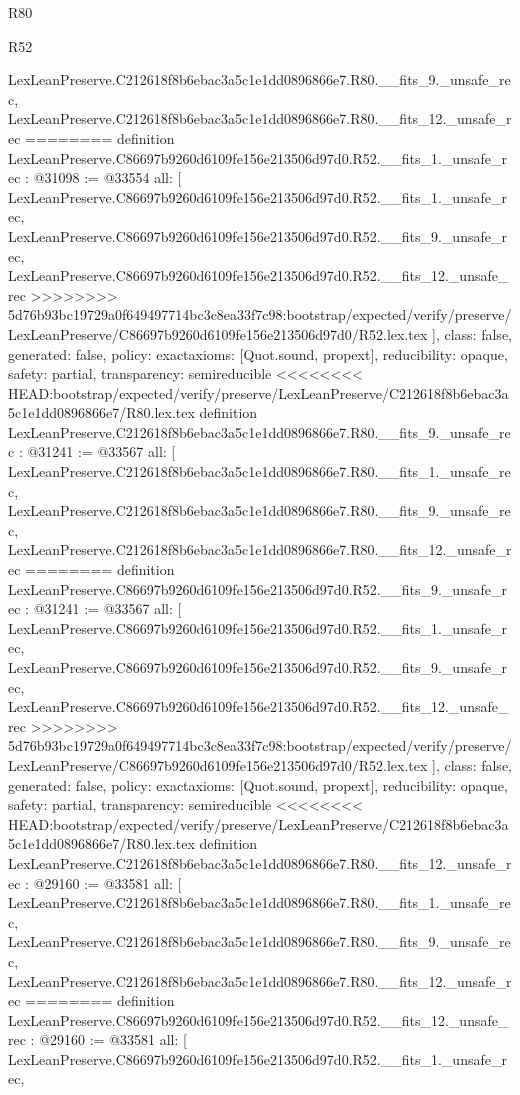 \begin{lexlean}{R80}
\begin{lexlean}{R52}
\begin{coremodule}
{{{{{{{{{{{{{{{{{{{{{{{{{{{{{{{{{{{{{{{{{{{{{{{{{{{{{{{{{{{{{{{{{{{{{{{{{{{{{{{{{{{{{{{{{{{{{{{{{{{{{{{{{{{{{{{{{{{{{{{{{{{{{{{{{{{{{{{{{{{{{{{{{{{{{{{{{{{    LexLeanPreserve.C212618f8b6ebac3a5c1e1dd0896866e7.R80.__fits_9._unsafe_rec,
    LexLeanPreserve.C212618f8b6ebac3a5c1e1dd0896866e7.R80.__fits_12._unsafe_rec
========
definition LexLeanPreserve.C86697b9260d6109fe156e213506d97d0.R52.__fits_1._unsafe_rec : @31098 := @33554 {
  all: [
    LexLeanPreserve.C86697b9260d6109fe156e213506d97d0.R52.__fits_1._unsafe_rec,
    LexLeanPreserve.C86697b9260d6109fe156e213506d97d0.R52.__fits_9._unsafe_rec,
    LexLeanPreserve.C86697b9260d6109fe156e213506d97d0.R52.__fits_12._unsafe_rec
>>>>>>>> 5d76b93bc19729a0f649497714bc3c8ea33f7c98:bootstrap/expected/verify/preserve/LexLeanPreserve/C86697b9260d6109fe156e213506d97d0/R52.lex.tex
  ],
  class: false,
  generated: false,
  policy: exact{axioms: [Quot.sound, propext]},
  reducibility: opaque{},
  safety: partial,
  transparency: semireducible
}
<<<<<<<< HEAD:bootstrap/expected/verify/preserve/LexLeanPreserve/C212618f8b6ebac3a5c1e1dd0896866e7/R80.lex.tex
definition LexLeanPreserve.C212618f8b6ebac3a5c1e1dd0896866e7.R80.__fits_9._unsafe_rec : @31241 := @33567 {
  all: [
    LexLeanPreserve.C212618f8b6ebac3a5c1e1dd0896866e7.R80.__fits_1._unsafe_rec,
    LexLeanPreserve.C212618f8b6ebac3a5c1e1dd0896866e7.R80.__fits_9._unsafe_rec,
    LexLeanPreserve.C212618f8b6ebac3a5c1e1dd0896866e7.R80.__fits_12._unsafe_rec
========
definition LexLeanPreserve.C86697b9260d6109fe156e213506d97d0.R52.__fits_9._unsafe_rec : @31241 := @33567 {
  all: [
    LexLeanPreserve.C86697b9260d6109fe156e213506d97d0.R52.__fits_1._unsafe_rec,
    LexLeanPreserve.C86697b9260d6109fe156e213506d97d0.R52.__fits_9._unsafe_rec,
    LexLeanPreserve.C86697b9260d6109fe156e213506d97d0.R52.__fits_12._unsafe_rec
>>>>>>>> 5d76b93bc19729a0f649497714bc3c8ea33f7c98:bootstrap/expected/verify/preserve/LexLeanPreserve/C86697b9260d6109fe156e213506d97d0/R52.lex.tex
  ],
  class: false,
  generated: false,
  policy: exact{axioms: [Quot.sound, propext]},
  reducibility: opaque{},
  safety: partial,
  transparency: semireducible
}
<<<<<<<< HEAD:bootstrap/expected/verify/preserve/LexLeanPreserve/C212618f8b6ebac3a5c1e1dd0896866e7/R80.lex.tex
definition LexLeanPreserve.C212618f8b6ebac3a5c1e1dd0896866e7.R80.__fits_12._unsafe_rec : @29160 := @33581 {
  all: [
    LexLeanPreserve.C212618f8b6ebac3a5c1e1dd0896866e7.R80.__fits_1._unsafe_rec,
    LexLeanPreserve.C212618f8b6ebac3a5c1e1dd0896866e7.R80.__fits_9._unsafe_rec,
    LexLeanPreserve.C212618f8b6ebac3a5c1e1dd0896866e7.R80.__fits_12._unsafe_rec
========
definition LexLeanPreserve.C86697b9260d6109fe156e213506d97d0.R52.__fits_12._unsafe_rec : @29160 := @33581 {
  all: [
    LexLeanPreserve.C86697b9260d6109fe156e213506d97d0.R52.__fits_1._unsafe_rec,
}}}}}}}}}}}}}}}}}}}}}}}}}}}}}}}}}}}}}}}}}}}}}}}}}}}}}}}}}}}}}}}}}}}}}}}}}}}}}}}}}}}}}}}}}}}}}}}}}}}}}}}}}}}}}}}}}}}}}}}}}}}}}}}}}}}}}}}}}}}}}}}}}}}}}}}}}}}}}}
\end{coremodule}
\end{lexlean}
\end{lexlean}
